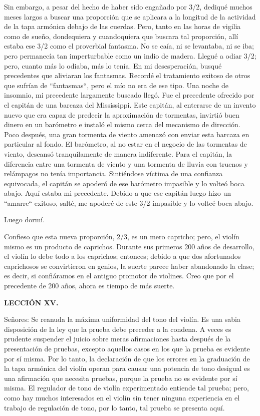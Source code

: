 \documentclass[12pt]{book}
\begin{document}
Sin embargo, a pesar del hecho de haber sido engañado por 3/2, dediqué muchos meses largos a buscar una proporción que se aplicara a la longitud de la actividad de la tapa armónica debajo de las cuerdas. Pero, tanto en las horas de vigilia como de sueño, dondequiera y cuandoquiera que buscara tal proporción, allí estaba ese 3/2 como el proverbial fantasma. No se caía, ni se levantaba, ni se iba; pero permanecía tan imperturbable como un indio de madera. Llegué a odiar 3/2; pero, cuanto más lo odiaba, más lo tenía. En mi desesperación, busqué precedentes que aliviaran los fantasmas. Recordé el tratamiento exitoso de otros que sufrían de ``fantasmas``, pero el mío no era de ese tipo. Una noche de insomnio, mi precedente largamente buscado llegó. Fue el precedente ofrecido por el capitán de una barcaza del Mississippi. Este capitán, al enterarse de un invento nuevo que era capaz de predecir la aproximación de tormentas, invirtió buen dinero en un barómetro e instaló el mismo cerca del mecanismo de dirección. Poco después, una gran tormenta de viento amenazó con enviar esta barcaza en particular al fondo. El barómetro, al no estar en el negocio de las tormentas de viento, descansó tranquilamente de manera indiferente. Para el capitán, la diferencia entre una tormenta de viento y una tormenta de lluvia con truenos y relámpagos no tenía importancia. Sintiéndose víctima de una confianza equivocada, el capitán se apoderó de ese barómetro impasible y lo volteó boca abajo. Aquí estaba mi precedente. Debido a que ese capitán luego hizo un ``amarre`` exitoso, salté, me apoderé de este 3/2 impasible y lo volteé boca abajo.

Luego dormí.

Confieso que esta nueva proporción, 2/3, es un mero capricho; pero, el violín mismo es un producto de caprichos. Durante sus primeros 200 años de desarrollo, el violín lo debe todo a los caprichos; entonces; debido a que dos afortunados caprichosos se convirtieron en genios, la suerte parece haber abandonado la clase; es decir, si confiáramos en el antiguo promotor de violines. Creo que por el precedente de 200 años, ahora es tiempo de más suerte.

\textbf{LECCIÓN XV.}

Señores: Se reanuda la máxima uniformidad del tono del violín. Es una sabia disposición de la ley que la prueba debe preceder a la condena. A veces es prudente suspender el juicio sobre meras afirmaciones hasta después de la presentación de pruebas, excepto aquellos casos en los que la prueba es evidente por sí misma. Por lo tanto, la declaración de que los errores en la graduación de la tapa armónica del violín operan para causar una potencia de tono desigual es una afirmación que necesita pruebas, porque la prueba no es evidente por sí misma. El regulador de tono de violín experimentado entiende tal prueba; pero, como hay muchos interesados en el violín sin tener ninguna experiencia en el trabajo de regulación de tono, por lo tanto, tal prueba se presenta aquí.
\end{document}
